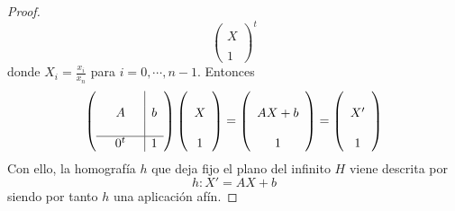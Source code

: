 \begin{proof}
\begin{equation*}
		\left( \begin{array}{c}
			\\
			X\\
			\\
			1
		\end{array}\right)^t
	\end{equation*}
	donde $X_i=\frac{x_i}{x_n}$ para $i=0,\cdots,n-1$. Entonces
	\begin{equation*}
		\left( \begin{array}{ccc|c}
			&&&\\
			&A&&b\\
			&&&\\ \hline
			&0^t&&1
		\end{array}\right)
		\left( \begin{array}{c}
			\\
			X\\
			\\
			1
		\end{array}\right)=
		\left( \begin{array}{c}
			\\
			AX+b\\
			\\
			1
		\end{array}\right)=
		\left( \begin{array}{c}
			\\
			X'\\
			\\
			1
		\end{array}\right)
	\end{equation*}
	Con ello, la homografía $h$ que deja fijo el plano del infinito $H$ viene descrita por
	\begin{equation}
		h:X'=AX+b
	\end{equation}
	siendo por tanto $h$ una aplicación afín.
\end{proof}

